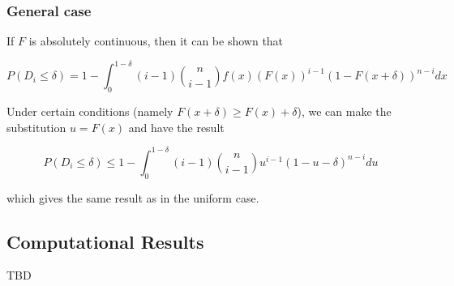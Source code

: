 \documentclass[
  11pt,
]{article}
\begin{document}
\hypertarget{general-case}{%
\subsubsection{General case}\label{general-case}}

If \(F\) is absolutely continuous, then it can be shown that

\[P(D_i \leq \delta) = 1 - \int_0^{1-\delta} (i-1) \binom{n}{i-1} f(x) (F(x))^{i-1} (1 - F(x + \delta))^{n-i} dx\]

Under certain conditions (namely \(F(x + \delta) \geq F(x) + \delta\)),
we can make the substitution \(u = F(x)\) and have the result

\[P(D_i \leq \delta) \leq 1- \int_0^{1 - \delta} (i-1) \binom{n}{i-1} u^{i-1} (1 - u - \delta)^{n-i} du\]

which gives the same result as in the uniform case.

\hypertarget{computational-results}{%
\subsection{Computational Results}\label{computational-results}}

TBD

  
\end{document}

